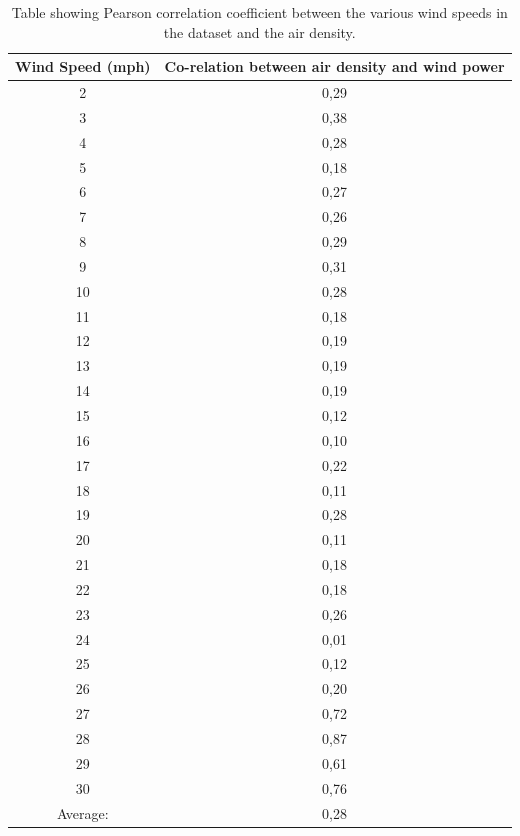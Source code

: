 \begin{table}[H]
\centering  %
\begin{tabular}{|c|c|} %
\hline
Wind Speed (mph) & Co-relation between air density and wind power \\ %
\hline                  %
2 & 0,29\\ \hline
3 & 0,38 \\ \hline
4 & 0,28 \\ \hline
5 & 0,18 \\ \hline
6 & 0,27 \\ \hline
7 & 0,26 \\ \hline
8 & 0,29 \\ \hline
9 & 0,31 \\ \hline
10 & 0,28  \\ \hline
11 & 0,18 \\ \hline
12 & 0,19 \\ \hline
13 & 0,19 \\ \hline
14 & 0,19 \\ \hline
15 & 0,12 \\ \hline
16 & 0,10 \\ \hline
17 & 0,22 \\ \hline
18 & 0,11 \\ \hline
19 & 0,28 \\ \hline
20 & 0,11 \\ \hline
21 & 0,18 \\ \hline
22 & 0,18 \\ \hline
23 & 0,26 \\ \hline
24 & 0,01 \\ \hline
25 & 0,12 \\ \hline
26 & 0,20 \\ \hline
27 & 0,72 \\ \hline
28 & 0,87 \\ \hline
29 & 0,61 \\ \hline
30 & 0,76 \\ \hline  
Average: & 0,28 \\ %
\hline %
\end{tabular}
\caption{Table showing Pearson correlation coefficient between the various wind speeds in the dataset and the air density.} %
\label{table:pearsonCoeficientAirDensity} %
\end{table}

